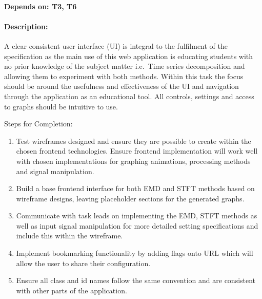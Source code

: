 \documentclass[
  paper=a4,
  ,captions=tableheading
]{scrartcl}
\begin{document}
\hypertarget{depends-on-t3-t6-1}{%
\paragraph{Depends on: T3, T6}\label{depends-on-t3-t6-1}}

\hypertarget{description-6}{%
\paragraph{Description:}\label{description-6}}

A clear consistent user interface (UI) is integral to the fulfilment of
the specification as the main use of this web application is educating
students with no prior knowledge of the subject matter i.e.~Time series
decomposition and allowing them to experiment with both methods. Within
this task the focus should be around the usefulness and effectiveness of
the UI and navigation through the application as an educational tool.
All controls, settings and access to graphs should be intuitive to use.

Steps for Completion: 

\begin{enumerate}
	\item Test wireframes designed and ensure they are possible to create within the chosen frontend technologies. Ensure frontend implementation will work well with chosen implementations for graphing animations, processing methods and signal manipulation.
	\item  Build a base frontend interface for both EMD and STFT methods based on wireframe designs, leaving placeholder sections for the generated graphs.
	\item Communicate with task leads on implementing the EMD, STFT methods as well as input signal manipulation for more detailed setting specifications and include this within the wireframe.
	\item Implement bookmarking functionality by adding flags onto URL which will allow the user to share their configuration.
	\item Ensure all class and id names follow the same convention and are consistent with other parts of the application.
\end{enumerate}
\end{document}
